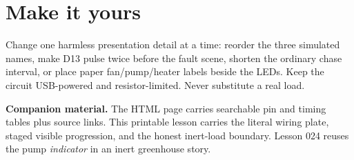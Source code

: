 \documentclass[11pt]{article}
\begin{document}
\section*{Make it yours}

Change one harmless presentation detail at a time: reorder the three simulated
names, make D13 pulse twice before the fault scene, shorten the ordinary chase
interval, or place paper fan/pump/heater labels beside the LEDs. Keep the
circuit USB-powered and resistor-limited. Never substitute a real load.

\vfill\small
\textbf{Companion material.} The HTML page carries searchable pin and timing
tables plus source links. This printable lesson carries the literal wiring
plate, staged visible progression, and the honest inert-load boundary. Lesson
024 reuses the pump \emph{indicator} in an inert greenhouse story.
\end{document}
